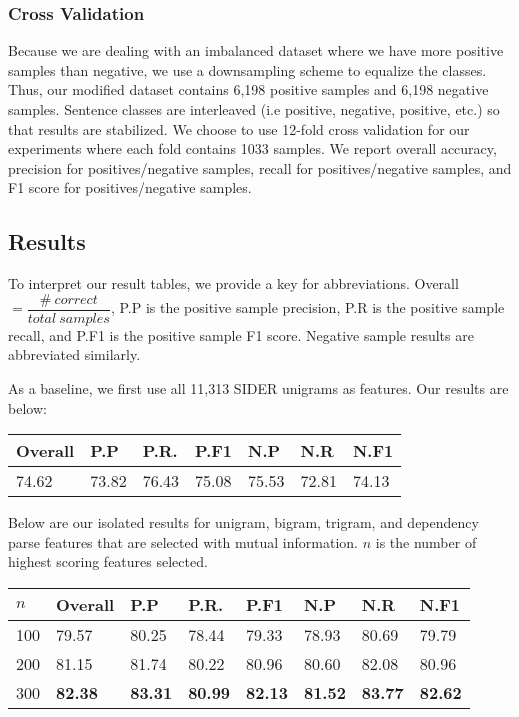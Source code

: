 \documentclass{acm_proc_article-sp}
\begin{document}
\subsubsection{Cross Validation}
Because we are dealing with an imbalanced dataset where we have more positive samples than negative, we use a downsampling scheme to equalize the classes. Thus, our modified dataset contains 6,198 positive samples and 6,198 negative samples. Sentence classes are interleaved (i.e positive, negative, positive, etc.) so that results are stabilized. We choose to use 12-fold cross validation for our experiments where each fold contains 1033 samples.
We report overall accuracy, precision for positives/negative samples, recall for positives/negative samples, and F1 score for positives/negative samples. 

\subsection{Results}
To interpret our result tables, we provide a key for abbreviations. Overall $= \dfrac{\#\:correct}{total\:samples}$, P.P is the positive sample precision, P.R is the positive sample recall, and P.F1 is the positive sample F1 score. Negative sample results are abbreviated similarly. 

As a baseline, we first use all 11,313 SIDER unigrams as features. Our results are below:

\vspace{-3mm}
\tabcolsep=0.11cm
\begin{tabular}{| l | l | l | l | l | l | l |}
\hline
Overall & P.P & P.R. & P.F1 & N.P & N.R & N.F1 \\ \hline
74.62 & 73.82 & 76.43 & 75.08 & 75.53 & 72.81 & 74.13 \\ \hline
\end{tabular} 

Below are our isolated results for unigram, bigram, trigram, and dependency parse features that are selected with mutual information. $n$ is the number of highest scoring features selected. 
\vspace{-3mm}
\tabcolsep=0.11cm
\begin{tabular}{| l | l | l | l | l | l | l | l |}
\hline
$n$ & Overall & P.P & P.R. & P.F1 & N.P & N.R & N.F1 \\ \hline
100 & 79.57 & 80.25 & 78.44 & 79.33 & 78.93 & 80.69 & 79.79 \\ \hline
200 & 81.15 & 81.74 & 80.22 & 80.96 & 80.60 & 82.08 & 80.96 \\ \hline
300 & \bf{82.38} & \bf{83.31} & \bf{80.99} & \bf{82.13} & \bf{81.52} & \bf{83.77} & \bf{82.62} \\ \hline
\end{tabular} 
\end{document}
